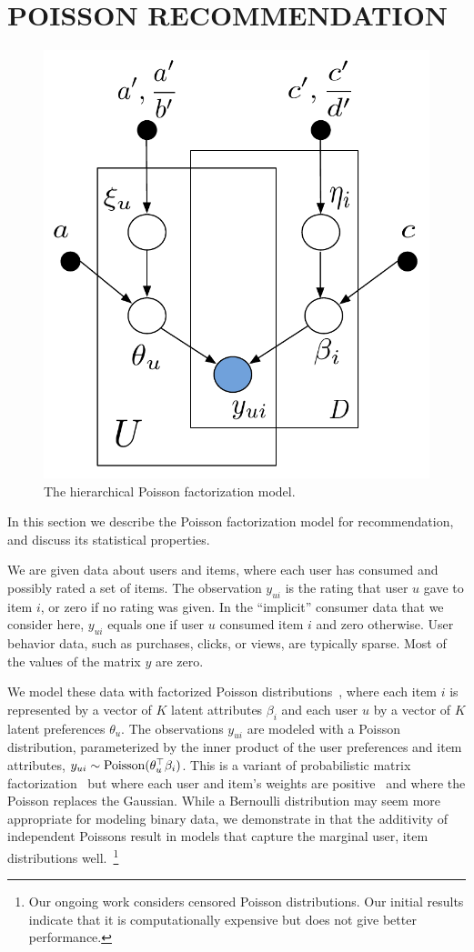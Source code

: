 \section{POISSON RECOMMENDATION}
\label{sec:model}

\begin{figure}[t]
\begin{center}
\includegraphics[width=0.5\columnwidth]{figures/hpf.pdf}
\caption{\small{The hierarchical Poisson factorization model.}}
\label{fig:hpf}
\end{center}
\end{figure}


In this section we describe the Poisson factorization model for
recommendation, and discuss its statistical properties.

We are given data about users and items, where each user has consumed
and possibly rated a set of items.  The observation $y_{ui}$ is the
rating that user $u$ gave to item $i$, or zero if no rating was given.
In the ``implicit'' consumer data that we consider here, $y_{ui}$
equals one if user $u$ consumed item $i$ and zero otherwise.  User
behavior data, such as purchases, clicks, or views, are typically
sparse.  Most of the values of the matrix $y$ are zero.

We model these data with factorized Poisson
distributions~\cite{Canny:2004}, where each item $i$ is represented by
a vector of $K$ latent attributes $\beta_i$ and each user $u$ by a
vector of $K$ latent preferences $\theta_u$.  The observations $y_{ui}$
are modeled with a Poisson distribution, parameterized by the inner product of
the user preferences and item attributes, $y_{ui} \sim
\textrm{Poisson}(\theta_u^\top \beta_i)$.  This is a variant of probabilistic
matrix factorization~\cite{Salakhutdinov:2008a} but where each user
and item's weights are positive~\cite{Lee:1999} and where the Poisson
replaces the Gaussian.
While a Bernoulli distribution may seem more appropriate for modeling
binary data, we demonstrate in  that the additivity
of independent Poissons result in models that capture the marginal
user, item distributions well.~\footnote{Our ongoing work considers
  censored Poisson distributions. Our initial results indicate that it
  is computationally expensive but does not give better performance.}

